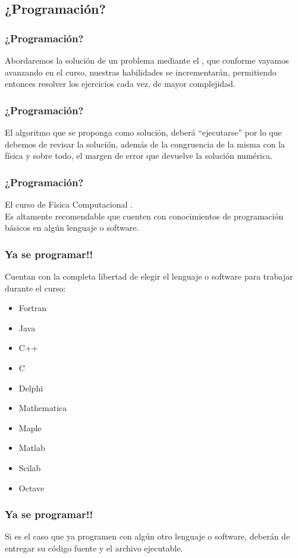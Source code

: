 \documentclass[12pt]{beamer}
\begin{document}
\subsection{¿Programación?}

\begin{frame}
\frametitle{¿Programación?}
Abordaremos la solución de un problema mediante el , que conforme vayamos avanzando en el curso, nuestras habilidades se incrementarán, permitiendo entonces resolver los ejercicios cada vez, de mayor complejidad.
\end{frame}
\begin{frame}
\frametitle{¿Programación?}
El algoritmo que se proponga como solución, deberá \enquote{ejecutarse} por lo que debemos de revisar la solución, además de la congruencia de la misma con la física y sobre todo, el margen de error que devuelve la solución numérica.
\end{frame}
\begin{frame}
\frametitle{¿Programación?}
El curso de Física Computacional .
\\
\bigskip
\pause
Es altamente recomendable que cuenten con conocimientos de programación básicos en algún lenguaje o software.
\end{frame}
\begin{frame}
\frametitle{Ya se programar!!}
Cuentan con la completa libertad de elegir el lenguaje o software para trabajar durante el curso:
\pause
\begin{multicols}{2}
\begin{itemize}
\item Fortran
\item Java
\item C++
\item C
\item Delphi
\item Mathematica
\item Maple
\item Matlab
\item Scilab
\item Octave
\end{itemize}
\end{multicols}
\end{frame}
\begin{frame}
\frametitle{Ya se programar!!}
Si es el caso que ya programen con algún otro lenguaje o software, deberán de entregar su código fuente y el archivo ejecutable.
\end{frame}
\end{document}
